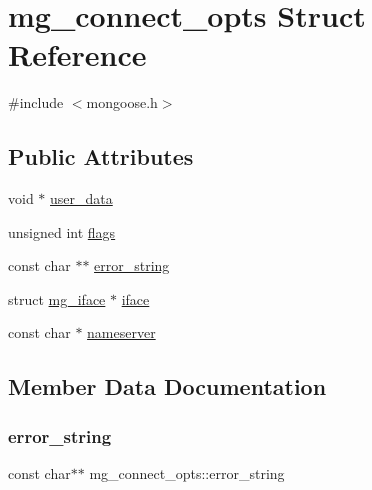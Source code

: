 \hypertarget{structmg__connect__opts}{}\section{mg\+\_\+connect\+\_\+opts Struct Reference}
\label{structmg__connect__opts}


{\ttfamily \#include $<$mongoose.\+h$>$}

\subsection*{Public Attributes}
\begin{DoxyCompactItemize}
\item 
void $\ast$ \hyperlink{structmg__connect__opts_a88039c409267c457638a0ebce97d7c5c_a88039c409267c457638a0ebce97d7c5c}{user\+\_\+data}
\item 
unsigned int \hyperlink{structmg__connect__opts_a794f93a8213aa29cdb59fb42075c0ab0_a794f93a8213aa29cdb59fb42075c0ab0}{flags}
\item 
const char $\ast$$\ast$ \hyperlink{structmg__connect__opts_a24fa9723e785487ed74b779c1e30ce75_a24fa9723e785487ed74b779c1e30ce75}{error\+\_\+string}
\item 
struct \hyperlink{structmg__iface}{mg\+\_\+iface} $\ast$ \hyperlink{structmg__connect__opts_a47c10391acd986fe2ff3f4f308bd1637_a47c10391acd986fe2ff3f4f308bd1637}{iface}
\item 
const char $\ast$ \hyperlink{structmg__connect__opts_a53edbf692c49f5ee86d2fe27ebba816c_a53edbf692c49f5ee86d2fe27ebba816c}{nameserver}
\end{DoxyCompactItemize}


\subsection{Member Data Documentation}
\mbox{\label{structmg__connect__opts_a24fa9723e785487ed74b779c1e30ce75_a24fa9723e785487ed74b779c1e30ce75}} 
\subsubsection{\texorpdfstring{error\+\_\+string}{error\_string}}
{\footnotesize\ttfamily const char$\ast$$\ast$ mg\+\_\+connect\+\_\+opts\+::error\+\_\+string}



